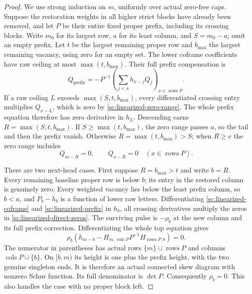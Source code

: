 \documentclass[11pt,a4paper]{amsart}
\numberwithin{equation}{section}
\theoremstyle{plain}
\theoremstyle{definition}
\begin{document}
\begin{proof}
We use strong induction on \(m\), uniformly over actual zero-free
caps.  Suppose the restoration weights in all higher strict blocks
have already been removed, and let \(P\) be their entire fixed proper
prefix, including its crossing blocks.  Write \(m_0\) for its largest
row, \(a\) for its least column, and \(S=m_0-a\); omit an empty prefix.
Let \(t\) be the largest remaining proper row and \(b_{\max}\) the
largest remaining vacancy, using zero for an empty set.  The lower
coframe coefficients have raw ceiling at most \(\max(t,b_{\max})\).
Their full prefix compensation is
\begin{equation}\label{sc:linearized-prefix}
 Q_{\mathrm{prefix}}
   =-P^{-1}\left(\sum_{j<a}h_{x-j}Q_j\right)_{
                           x\in\operatorname{rows}P}.
\end{equation}
If a raw ceiling \(L\) exceeds \(\max(S,t,b_{\max})\), every
differentiated crossing entry multiplies \(Q_{x-L}\), which is zero
by \eqref{sc:linearized-zero-range}.  The whole prefix equation
therefore has zero derivative in \(h_L\).  Descending earns
\(R=\max(S,t,b_{\max})\).  If \(S\ge\max(t,b_{\max})\), the zero
range passes \(a\), so the tail and then the prefix vanish.  Otherwise
\(R=\max(t,b_{\max})>S\); when \(R\ge v\) the zero range includes
\begin{equation}\label{sc:linearized-direct-zeros}
 Q_{m-R}=0,\qquad Q_{x-R}=0
       \quad(x\in\operatorname{rows}P).
\end{equation}

There are two next-head cases.  First suppose \(R=b_{\max}>t\) and
write \(b=R\).  Every remaining baseline proper row is below \(b\);
its entry in the restored column is genuinely zero.  Every weighted
vacancy lies below the least prefix column, so \(b<a\), and
\(P_b-h_b\) is a function of lower raw letters.  Differentiating
\eqref{sc:linearized-coframe} and
\eqref{sc:linearized-prefix} in \(h_b\), all crossing derivatives
multiply the zeros in \eqref{sc:linearized-direct-zeros}.
The surviving pulse is \(-\rho_b\) at the new column and its full
prefix correction.  Differentiating the whole top equation gives
\begin{equation}\label{sc:gap-coface}
 \rho_b\left(h_{m-b}
  -H_{m,\operatorname{cols}P}P^{-1}H_{\operatorname{rows}P,b}
       \right)=0.
\end{equation}
The numerator in parentheses has actual rows
\(\{m\}\cup\operatorname{rows}P\) and columns
\(\operatorname{cols}P\cup\{b\}\).  On \([b,m)\) its height is one
plus the prefix height, with the two genuine singleton ends.  It is
therefore an actual connected skew diagram with nonzero Schur
function.  Its full denominator is \(\det P\).  Consequently
\(\rho_b=0\).  This also handles the case with no proper block left.


\end{proof}
\end{document}
